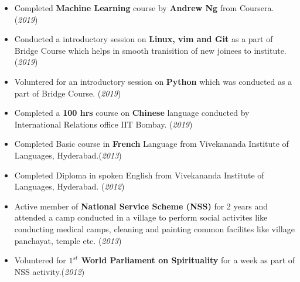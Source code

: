 \documentclass[10pt]{article}
\begin{document}
\begin{itemize}
		\item {Completed \textbf{Machine Learning} course by \textbf{Andrew Ng} from Coursera. }\hfill{(\textit{2019})}
	\item {Conducted a introductory session on \textbf{Linux, vim and Git} as a part of Bridge Course which helps in smooth tranisition of new joinees to institute. }\hfill{(\textit{2019})}
	\item {Voluntered for an introductory session on \textbf{Python} which was conducted as a part of Bridge Course.}
	\hfill{(\textit{2019})}
    \item {Completed a \textbf{100 hrs} course on \textbf{Chinese} language conducted by International Relations office IIT Bombay. }\hfill{(\textit{2019})}
    \item {Completed Basic course in \textbf{French} Language from Vivekananda Institute of Languages, Hyderabad.}\hfill{(\textit{2013})}

    \item {Completed Diploma in spoken English from Vivekananda Institute of Languages, Hyderabad.} \hfill{(\textit{2012})}
   \item {Active member of \textbf{National Service Scheme (NSS)} for 2 years and attended a camp conducted in a village to perform social activites like conducting medical camps, cleaning and painting common facilites like village panchayat, temple etc.} \hfill{(\textit{2013})}
   \item {Voluntered for \textbf{$1^{st}$ World Parliament on Spirituality} for a week as part of NSS activity.}\hfill{(\textit{2012})}
    
\end{itemize}

\end{document}
